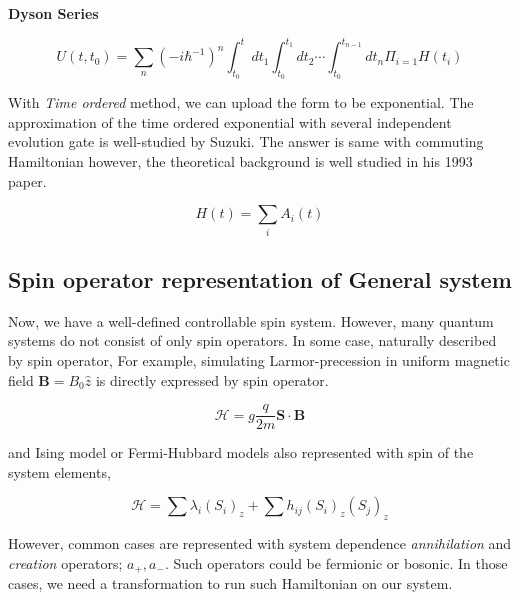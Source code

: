 \begin{theorem}\textbf{Dyson Series}
    
    \begin{equation*}
        U(t, t_0) = \sum_n (-i \hbar^{-1})^n \int_{t_0}^{t} dt_1 \int_{t_0}^{t_1} dt_2 \cdots \int_{t_0}^{t_{n-1}} dt_n \Pi_{i=1} H(t_i)
    \end{equation*}
\end{theorem}

With \textit{Time ordered} method, we can upload the form 
to be exponential. The approximation of the time ordered exponential 
with several independent evolution gate is well-studied by Suzuki\cite{suzuki_general_1993}.
The answer is same with commuting Hamiltonian however, 
the theoretical background is well studied in his 1993 paper.


\begin{equation}
    H(t) = \sum_{i} A_i (t)
\end{equation}




\subsection{Spin operator representation of General system}

Now, we have a well-defined controllable spin system. However, many quantum systems do not consist of only spin operators.
In some case, naturally described by spin operator, 
For example, simulating Larmor-precession in uniform magnetic field $\mathbf{B} = B_0 \hat{z}$ is directly expressed by spin operator.

\begin{equation}
    \mathcal{H} = g \frac{q}{2m} \mathbf{S} \cdot \mathbf{B}
\end{equation}

and Ising model or Fermi-Hubbard models also represented with spin of the system elements,%

\begin{equation}
    \mathcal{H} = \sum \lambda_i (S_i)_z + \sum h_{ij} (S_i)_z (S_j)_z
\end{equation}

However, common cases are represented with
system dependence \textit{annihilation} and \textit{creation} operators; $a_+, a_-$.
Such operators could be fermionic or bosonic. 
In those cases, we need a transformation to run such Hamiltonian on our system.


